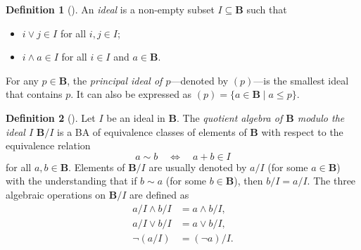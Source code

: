 \documentclass{article}
\theoremstyle{definition}
\newtheorem{definition}{Definition}
\theoremstyle{remark}
\begin{document}

\begin{definition}[\cite{givant2008introduction}] \label{def:ideal}
  An \emph{ideal} is a non-empty subset $I \subseteq \mathbf{B}$ such that
  \begin{itemize}
  \item $i \lor j \in I$ for all $i, j \in I$;
  \item $i \land a \in I$ for all $i \in I$ and $a \in \mathbf{B}$.
  \end{itemize}
  For any $p \in \mathbf{B}$, the \emph{principal ideal of $p$}---denoted by
  $(p)$---is the smallest ideal that contains $p$. It can also be expressed as
  $(p) = \{ a \in \mathbf{B} \mid a \le p \}$.
\end{definition}

\begin{definition}[\cite{givant2008introduction}] \label{def:quotient}
  Let $I$ be an ideal in $\mathbf{B}$. The \emph{quotient algebra of
    $\mathbf{B}$ modulo the ideal $I$} $\mathbf{B}/I$ is a BA
  of equivalence classes of elements of $\mathbf{B}$ with respect to the
  equivalence relation
  \[
    a \sim b \quad \iff \quad a + b \in I
  \]
  for all $a, b \in \mathbf{B}$. Elements of $\mathbf{B}/I$ are usually denoted
  by $a/I$ (for some $a \in \mathbf{B}$) with the understanding that if $b \sim
  a$ (for some $b \in \mathbf{B}$), then $b/I = a/I$. The three algebraic
  operations on $\mathbf{B}/I$ are defined as
  \begin{align*}
    a/I \land b/I &= a \land b / I, \\
    a/I \lor b/I &= a \lor b / I, \\
    \neg(a/I) &= (\neg a)/I.
  \end{align*}
\end{definition}
\end{document}
